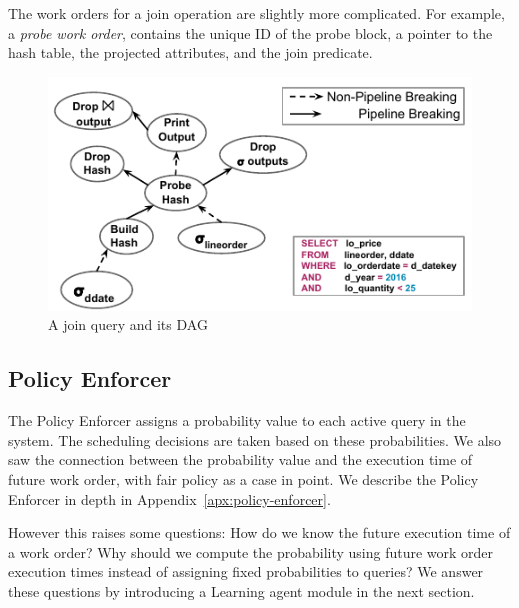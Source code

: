 The work orders for a join operation %
are slightly more complicated. 
For example, a \textit{probe work order},  contains the unique ID of the probe 
block, 
a pointer to the hash table, the projected attributes, and the join predicate.


\begin{figure}[h]
	\centering
	\includegraphics[width=\columnwidth]{figures/QueryPlan.pdf}
	\vspace*{-2em}
	\caption{A join query and its DAG}
	\label{fig:dag}
\end{figure}

\subsection{Policy Enforcer}\label{ssec:policy-enforcer}
The Policy Enforcer assigns a probability value to each active query in the system. 
The scheduling decisions are taken based on these probabilities. 
We also saw the connection between the probability value and the execution time of future work order, with fair policy as a case in point. 
We describe the Policy Enforcer in depth in Appendix~\ref{apx:policy-enforcer}.

However this raises some questions: How do we know the future execution time of a work order? 
Why should we compute the probability using future work order execution times instead of assigning fixed probabilities to queries?
We answer these questions by introducing a Learning agent module in the next section. 
 
